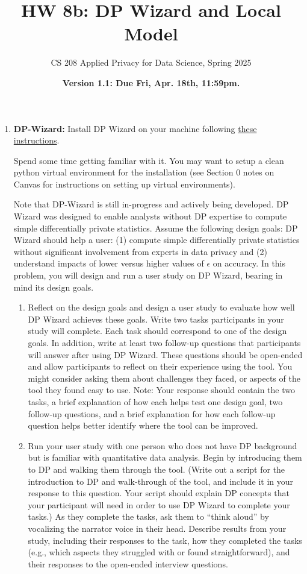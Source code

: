 \documentclass[11pt]{article}
\title{\vspace{-1.5cm} HW 8b: DP Wizard and Local Model}
\author{CS 208 Applied Privacy for Data Science, Spring 2025}
\date{\textbf{Version 1.1: Due Fri, Apr. 18th, 11:59pm.}}
\begin{document}
\maketitle

\instructions

\begin{enumerate}[leftmargin=*] 

    \item \textbf{DP-Wizard:}\label{part:dp-wizard} Install DP Wizard on your machine following \href{https://opendp.org/blog/dp-wizard-easy-way-get-started-differential-privacy-and-opendp}{these instructions}.
    
    Spend some time getting familiar with it. You may want to setup a clean python virtual environment for the installation (see Section 0 notes on Canvas for instructions on setting up virtual environments). 

Note that DP-Wizard is still in-progress and actively being developed. DP Wizard was designed to enable analysts without DP expertise to compute simple differentially private statistics. Assume the following design goals:
DP Wizard should help a user:
(1) compute simple differentially private statistics without significant involvement from experts in data privacy and (2) understand impacts of lower versus higher values of $\epsilon$ on accuracy. In this problem, you will design and run a user study on DP Wizard, bearing in mind its design goals.

\begin{enumerate}
    \item Reflect on the design goals and design a user study to evaluate how well DP Wizard achieves these goals. Write two tasks participants in your study will complete. Each task should correspond to one of the design goals. In addition, write at least two follow-up questions that participants will answer after using DP Wizard. These questions should be open-ended and allow participants to reflect on their experience using the tool. You might consider asking them about challenges they faced, or aspects of the tool they found easy to use. Note: Your response should contain the two tasks, a brief explanation of how each helps test one design goal, two follow-up questions, and a brief explanation for how each follow-up question helps better identify where the tool can be improved.
    
    \item Run your user study with one person who does not have DP background but is familiar with quantitative data analysis. Begin by introducing them to DP and walking them through the tool. (Write out a script for the introduction to DP and walk-through of the tool, and include it in your response to this question. Your script should explain DP concepts that your participant will need in order to use DP Wizard to complete your tasks.) As they complete the tasks, ask them to ``think aloud'' by vocalizing the narrator voice in their head. Describe results from your study, including their responses to the task, how they completed the tasks (e.g., which aspects they struggled with or found straightforward), and their responses to the open-ended interview questions.


\end{enumerate}
\end{enumerate}
\end{document}
